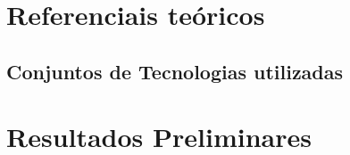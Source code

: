 \documentclass[
	12pt,				%
	openright,			%
	oneside,			%
	a4paper,			%
	english,			%
	french,				%
	spanish,			%
	brazil				%
	]{elementos/customizacao}
\begin{document}



%

\part{Referenciais teóricos}

\chapter{Conjuntos de Tecnologias utilizadas}


\part{Resultados Preliminares}




\end{document}
